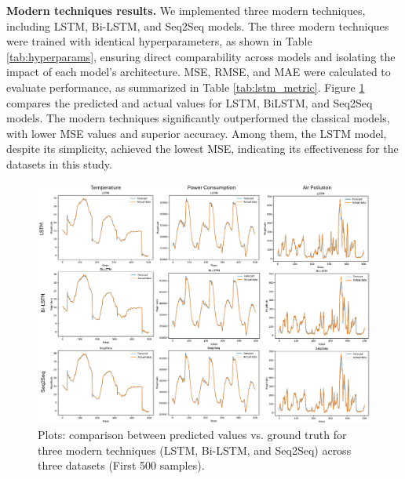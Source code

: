 \documentclass[sn-mathphys-num]{sn-jnl}
\theoremstyle{thmstyleone}%
\theoremstyle{thmstyletwo}%
\theoremstyle{thmstylethree}%
\begin{document}
\textbf{Modern techniques results.} 
We implemented three modern techniques, including LSTM, Bi-LSTM, and Seq2Seq models. The three modern techniques were trained with identical hyperparameters, as shown in Table \ref{tab:hyperparams}, ensuring direct comparability across models and isolating the impact of each model's architecture. MSE, RMSE, and MAE were calculated to evaluate performance, as summarized in Table \ref{tab:lstm_metric}. Figure \ref{fig:modern} compares the predicted and actual values for LSTM, BiLSTM, and Seq2Seq models. The modern techniques significantly outperformed the classical models, with lower MSE values and superior accuracy. Among them, the LSTM model, despite its simplicity, achieved the lowest MSE, indicating its effectiveness for the datasets in this study.

\begin{figure}[]
	\begin{center}
		\includegraphics[scale=0.6]{modern.pdf}
	\end{center}
	\caption{Plots: comparison between predicted values vs. ground truth for three modern techniques (LSTM, Bi-LSTM, and Seq2Seq) across three datasets (First 500 samples).}
	\label{fig:modern}
\end{figure}
\end{document}
